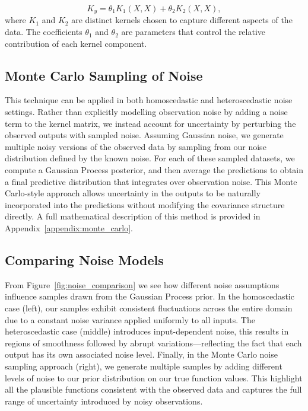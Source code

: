 \documentclass{ucdgradtaughtthesis}
\begin{document}
\begin{equation}
    K_y = \theta_1 K_1(X, X) + \theta_2 K_2(X, X),
    \label{eq:additive_kernel}
\end{equation}
where \( K_1 \) and \( K_2 \) are distinct kernels chosen to capture different aspects of the data. 
The coefficients \( \theta_1 \) and \( \theta_2 \) are parameters that control the relative contribution of each kernel component.

\subsection{Monte Carlo Sampling of Noise}  

This technique can be applied in both homoscedastic and heteroscedastic noise settings. Rather than explicitly modelling observation noise by adding a noise term to the kernel matrix, we instead account for uncertainty by perturbing the observed outputs with sampled noise.
Assuming Gaussian noise, we generate multiple noisy versions of the observed data by sampling from our noise distribution defined by the known noise. For each of these sampled datasets, we compute a Gaussian Process posterior, and then average the predictions to obtain a final predictive distribution that integrates over observation noise.
This Monte Carlo-style approach allows uncertainty in the outputs to be naturally incorporated into the predictions without modifying the covariance structure directly. A full mathematical description of this method is provided in Appendix~\ref{appendix:monte_carlo}.

%
%
\subsection{Comparing Noise Models}
From Figure~\ref{fig:noise_comparison} we see how different noise assumptions influence samples drawn from the Gaussian Process prior. 
In the homoscedastic case (left), our samples exhibit consistent fluctuations across the entire domain due to a constant noise variance applied uniformly to all inputs. 
The heteroscedastic case (middle) introduces input-dependent noise, this results in regions of smoothness followed by abrupt variations—reflecting the fact that each output has its own associated noise level.
Finally, in the Monte Carlo noise sampling approach (right), we generate multiple samples by adding different levels of noise to our prior distribution on our true function values.
This highlight all the plausible functions consistent with the observed data and captures the full range of uncertainty introduced by noisy observations.
\end{document}
